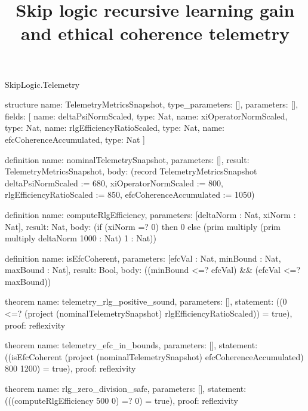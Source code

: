 \begin{lexlean}{SkipLogic.Telemetry}
\title{Skip logic recursive learning gain and ethical coherence telemetry}
\begin{semanticmodule}
structure{
  name: TelemetryMetricsSnapshot,
  type_parameters: [],
  parameters: [],
  fields: [
    {name: deltaPsiNormScaled, type: Nat},
    {name: xiOperatorNormScaled, type: Nat},
    {name: rlgEfficiencyRatioScaled, type: Nat},
    {name: efcCoherenceAccumulated, type: Nat}
  ]
}

definition{
  name: nominalTelemetrySnapshot,
  parameters: [],
  result: TelemetryMetricsSnapshot,
  body: (record TelemetryMetricsSnapshot {deltaPsiNormScaled := 680, xiOperatorNormScaled := 800, rlgEfficiencyRatioScaled := 850, efcCoherenceAccumulated := 1050})
}

definition{
  name: computeRlgEfficiency,
  parameters: [deltaNorm : Nat, xiNorm : Nat],
  result: Nat,
  body: (if (xiNorm =? 0) then 0 else (prim multiply (prim multiply deltaNorm 1000 : Nat) 1 : Nat))
}

definition{
  name: isEfcCoherent,
  parameters: [efcVal : Nat, minBound : Nat, maxBound : Nat],
  result: Bool,
  body: ((minBound <=? efcVal) && (efcVal <=? maxBound))
}

theorem{
  name: telemetry_rlg_positive_sound,
  parameters: [],
  statement: ((0 <=? (project (nominalTelemetrySnapshot) rlgEfficiencyRatioScaled)) = true),
  proof: reflexivity{}
}

theorem{
  name: telemetry_efc_in_bounds,
  parameters: [],
  statement: ((isEfcCoherent (project (nominalTelemetrySnapshot) efcCoherenceAccumulated) 800 1200) = true),
  proof: reflexivity{}
}

theorem{
  name: rlg_zero_division_safe,
  parameters: [],
  statement: (((computeRlgEfficiency 500 0) =? 0) = true),
  proof: reflexivity{}
}
\end{semanticmodule}
\end{lexlean}
